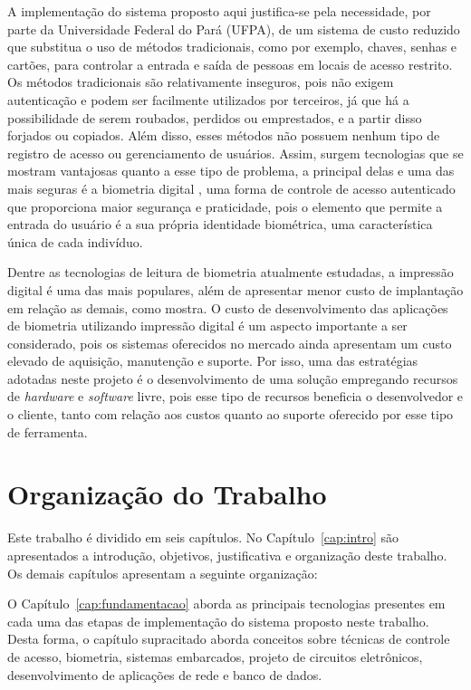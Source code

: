 A implementação do sistema proposto aqui justifica-se pela necessidade, por parte da Universidade Federal do Pará (UFPA), de um sistema de custo reduzido que substitua o uso de métodos tradicionais, como por exemplo, chaves, senhas e cartões, para controlar a entrada e saída de pessoas em locais de acesso restrito. Os métodos tradicionais são relativamente inseguros, pois não  exigem autenticação e podem ser  facilmente  utilizados por terceiros, já que há a possibilidade de serem roubados, perdidos ou emprestados, e a partir disso forjados ou copiados. Além disso, esses métodos não possuem nenhum tipo de registro de acesso ou gerenciamento de usuários. Assim, surgem tecnologias que se mostram vantajosas quanto a esse tipo de problema, a principal delas e uma das mais seguras é a biometria digital \cite{newman2009security}, uma forma de controle de acesso autenticado que proporciona maior segurança e praticidade, pois o elemento que permite a entrada do usuário é a sua própria identidade biométrica, uma característica única de cada indivíduo.
 

Dentre as tecnologias de leitura de biometria atualmente estudadas, a impressão digital é uma das mais populares, além de apresentar menor custo de implantação em relação as demais, como mostra. O custo de desenvolvimento das aplicações de biometria utilizando impressão digital é um aspecto importante a ser considerado, pois os sistemas oferecidos no mercado ainda apresentam um custo elevado de aquisição, manutenção e suporte. Por isso, uma das estratégias adotadas neste projeto é o desenvolvimento de uma solução empregando recursos de \textit{hardware} e \textit{software} livre, pois esse tipo de recursos beneficia o desenvolvedor e o cliente, tanto com relação aos custos quanto ao suporte oferecido por esse tipo de ferramenta.


\section{Organização do Trabalho}

Este trabalho é dividido em seis capítulos. No Capítulo~\ref{cap:intro} são apresentados a introdução, objetivos, justificativa e organização deste trabalho. Os demais capítulos apresentam a seguinte organização: 

O Capítulo~\ref{cap:fundamentacao} aborda as principais tecnologias presentes em cada uma das etapas de implementação do sistema proposto neste trabalho. Desta forma, o capítulo supracitado aborda conceitos sobre técnicas de controle de acesso, biometria, sistemas embarcados, projeto de circuitos eletrônicos, desenvolvimento de aplicações de rede e banco de dados. 

